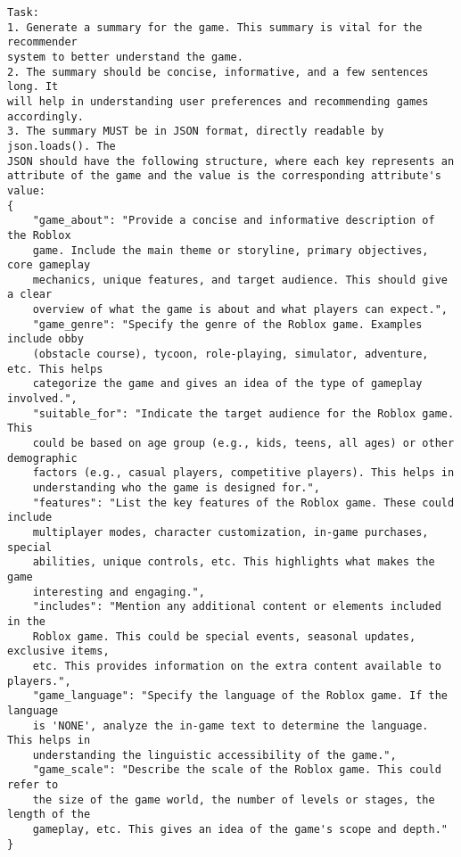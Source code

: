 \begin{lstlisting}
Task:
1. Generate a summary for the game. This summary is vital for the recommender
system to better understand the game.
2. The summary should be concise, informative, and a few sentences long. It
will help in understanding user preferences and recommending games accordingly.
3. The summary MUST be in JSON format, directly readable by json.loads(). The
JSON should have the following structure, where each key represents an
attribute of the game and the value is the corresponding attribute's value:
{
    "game_about": "Provide a concise and informative description of the Roblox
    game. Include the main theme or storyline, primary objectives, core gameplay
    mechanics, unique features, and target audience. This should give a clear
    overview of what the game is about and what players can expect.",
    "game_genre": "Specify the genre of the Roblox game. Examples include obby
    (obstacle course), tycoon, role-playing, simulator, adventure, etc. This helps
    categorize the game and gives an idea of the type of gameplay involved.",
    "suitable_for": "Indicate the target audience for the Roblox game. This
    could be based on age group (e.g., kids, teens, all ages) or other demographic
    factors (e.g., casual players, competitive players). This helps in
    understanding who the game is designed for.",
    "features": "List the key features of the Roblox game. These could include
    multiplayer modes, character customization, in-game purchases, special
    abilities, unique controls, etc. This highlights what makes the game
    interesting and engaging.",
    "includes": "Mention any additional content or elements included in the
    Roblox game. This could be special events, seasonal updates, exclusive items,
    etc. This provides information on the extra content available to players.",
    "game_language": "Specify the language of the Roblox game. If the language
    is 'NONE', analyze the in-game text to determine the language. This helps in
    understanding the linguistic accessibility of the game.",
    "game_scale": "Describe the scale of the Roblox game. This could refer to
    the size of the game world, the number of levels or stages, the length of the
    gameplay, etc. This gives an idea of the game's scope and depth."
}
\end{lstlisting}

